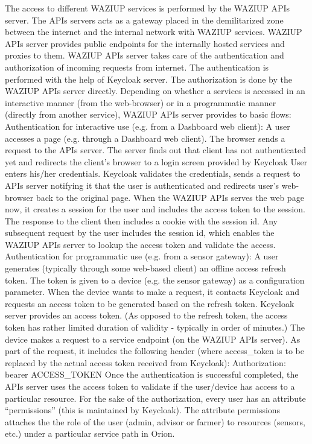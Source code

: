 The access to different WAZIUP services is performed by the WAZIUP APIs server. The APIs servers acts as a gateway placed in the demilitarized zone between the internet and the internal network with WAZIUP services. WAZIUP APIs server provides public endpoints for the internally hosted services and proxies to them. 
WAZIUP APIs server takes care of the authentication and authorization of incoming requests from internet. The authentication is performed with the help of Keycloak server. The authorization is done by the WAZIUP APIs server directly.
Depending on whether a services is accessed in an interactive manner (from the web-browser) or in a programmatic manner (directly from another service), WAZIUP APIs server provides to basic flows:
Authentication for interactive use (e.g. from a Dashboard web client):
A user accesses a page (e.g. through a Dashboard web client). The browser sends a request to the APIs server.
The server finds out that client has not authenticated yet and redirects the client’s browser to a login screen provided by Keycloak
User enters his/her credentials.
Keycloak validates the credentials, sends a request to APIs server notifying it that the user is authenticated and redirects user’s web-browser back to the original page.
When the WAZIUP APIs serves the web page now, it creates a session for the user and includes the access token to the session. The response to the client then includes a cookie with the session id.
Any subsequent request by the user includes the session id, which enables the WAZIUP APIs server to lookup the access token and validate the access.
Authentication for programmatic use (e.g. from a sensor gateway):
A user generates (typically through some web-based client) an offline access refresh token. The token is given to a device (e.g. the sensor gateway) as a configuration parameter.
When the device wants to make a request, it contacts Keycloak and requests an access token to be generated based on the refresh token.
Keycloak server provides an access token. (As opposed to the refresh token, the access token has rather limited duration of validity - typically in order of minutes.)
The device makes a request to a service endpoint (on the WAZIUP APIs server). As part of the request, it includes the following header (where access\_token is to be replaced by the actual access token received from Keycloak):
Authorization: bearer ACCESS\_TOKEN
Once the authentication is successful completed, the APIs server uses the access token to validate if the user/device has access to a particular resource.
For the sake of the authorization, every user has an attribute “permissions” (this is maintained by Keycloak). The attribute permissions attaches the the role of the user (admin, advisor or farmer) to resources (sensors, etc.) under a particular service path in Orion.

